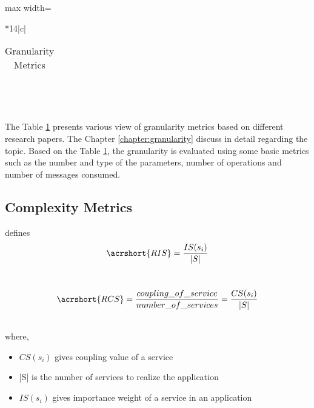 {{{{\begin{table}[h!]
\begin{adjustbox}{max width=\textwidth}
\begin{tabular}{*{14}{|c}|}
\begin{tabular}{cl}
                    \end{tabular}\\
                    \hline
\end{tabular}
\end{adjustbox}
  \caption{Granularity Metrics}
  \label{tab:quality_of_service/quality_attributes/granularity_metrics}
\end{table}
\\
The Table \ref{tab:quality_of_service/quality_attributes/granularity_metrics} presents various view of granularity metrics based on different research papers. The Chapter \ref{chapter:granularity} discuss in detail regarding the topic. Based on the Table \ref{tab:quality_of_service/quality_attributes/granularity_metrics}, the granularity is evaluated using some basic metrics such as the number and type of the parameters, number of operations and number of messages consumed.
\\

\subsection{Complexity Metrics}{\label{section:quality_of_service/quality_metrics/complexity}

\cite{Zhang:2009aa} defines
$$ \acrshort{RIS} = \frac{IS(s_i)}{|S|}$$

\\

$$  \acrshort{RCS} = \frac{coupling\_of\_service}{number\_of\_services} = \frac{CS(s_i)}{|S|}$$

\\
where,
\\
\begin{itemize}[leftmargin=.5in]
\item $CS(s_i)$ gives coupling value of a service
\item |S| is the number of services to realize the application
\item $IS(s_i)$ gives importance weight of a service in an application
\end{itemize}

}}}}}
